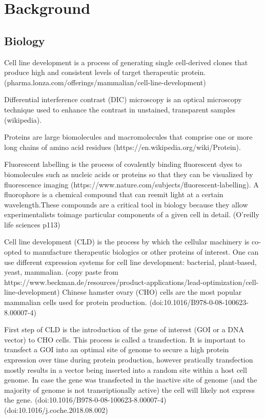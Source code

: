\section{Background}
\subsection{Biology}
Cell line development is a process of generating single cell-derived clones that produce high and consistent levels of target therapeutic protein. (pharma.lonza.com/offerings/mammalian/cell-line-development)

Differential interference contrast (DIC) microscopy is an optical microscopy technique used to enhance the contrast in unstained, transparent samples (wikipedia).

Proteins are large biomolecules and macromolecules that comprise one or more long chains of amino acid residues (https://en.wikipedia.org/wiki/Protein).

Fluorescent labelling is the process of covalently binding fluorescent dyes to biomolecules such as nucleic acids or proteins so that they can be visualized by fluorescence imaging (https://www.nature.com/subjects/fluorescent-labelling). A fluorophore is a chemical compound that can reemit light at a certain wavelength.These compounds are a critical tool in biology because they allow experimentalists toimage particular components of a given cell in detail. (O'reilly life sciences p113)

Cell line development (CLD) is the process by which the cellular machinery is co-opted to manufacture therapeutic biologics or other proteins of interest. One can use different expression systems for cell line development: bacterial, plant-based, yeast, mammalian. (copy paste from https://www.beckman.de/resources/product-applications/lead-optimization/cell-line-development) Chinese hamster ovary (CHO) cells are the most popular mammalian cells used for protein production. (doi:10.1016/B978-0-08-100623-8.00007-4) 

First step of CLD is the
introduction of the gene of interest (GOI or a DNA vector) to CHO cells. This process is called a transfection. It is important to transfect a GOI into an optimal site of genome to secure a high protein expression over time during protein production, however pratically transfection mostly results in a vector being inserted into a random site within a host cell genome. In case the gene was transfected in the inactive site of genome (and the majority of genome is not transriptionally active) the cell will likely not express the gene. (doi:10.1016/B978-0-08-100623-8.00007-4) (doi:10.1016/j.coche.2018.08.002)

